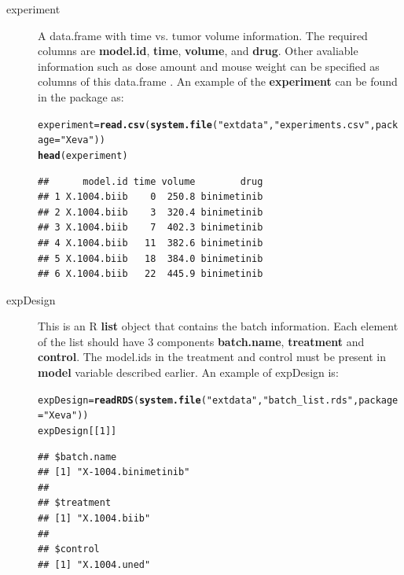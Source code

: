 \documentclass{article}\usepackage[]{graphicx}\usepackage[]{xcolor}
\makeatletter
\newcommand{\hlnum}[1]{\textcolor[rgb]{0.686,0.059,0.569}{#1}}%
\newcommand{\hlstr}[1]{\textcolor[rgb]{0.192,0.494,0.8}{#1}}%
\newcommand{\hlstd}[1]{\textcolor[rgb]{0.345,0.345,0.345}{#1}}%
\newcommand{\hlkwb}[1]{\textcolor[rgb]{0.69,0.353,0.396}{#1}}%
\newcommand{\hlkwc}[1]{\textcolor[rgb]{0.333,0.667,0.333}{#1}}%
\newcommand{\hlkwd}[1]{\textcolor[rgb]{0.737,0.353,0.396}{\textbf{#1}}}%
\newenvironment{kframe}{%
 \def\at@end@of@kframe{}%
 \ifinner\ifhmode%
  \def\at@end@of@kframe{\end{minipage}}%
  \begin{minipage}{\columnwidth}%
 \fi\fi%
 \def\FrameCommand##1{\hskip\@totalleftmargin \hskip-\fboxsep
 \colorbox{shadecolor}{##1}\hskip-\fboxsep
     \hskip-\linewidth \hskip-\@totalleftmargin \hskip\columnwidth}%
 \MakeFramed {\advance\hsize-\width
   \@totalleftmargin\z@ \linewidth\hsize
   \@setminipage}}%
 {\par\unskip\endMakeFramed%
 \at@end@of@kframe}
\newenvironment{knitrout}{}{} %
\makeatother
\begin{document}
\begin{description}
\item[experiment]
A data.frame with time vs. tumor volume information.
The required columns are \textbf{model.id}, \textbf{time}, \textbf{volume}, and \textbf{drug}.
Other avaliable information such as dose amount and mouse weight can be specified as columns of this data.frame .
An example of the \textbf{experiment} can be found in the package as:
\begin{knitrout}
\color{fgcolor}\begin{kframe}
\begin{alltt}
\hlstd{experiment}\hlkwb{=}\hlkwd{read.csv}\hlstd{(}\hlkwd{system.file}\hlstd{(}\hlstr{"extdata"}\hlstd{,}\hlstr{"experiments.csv"}\hlstd{,}\hlkwc{package}\hlstd{=}\hlstr{"Xeva"}\hlstd{))}
\hlkwd{head}\hlstd{(experiment)}
\end{alltt}
\begin{verbatim}
##      model.id time volume        drug
## 1 X.1004.biib    0  250.8 binimetinib
## 2 X.1004.biib    3  320.4 binimetinib
## 3 X.1004.biib    7  402.3 binimetinib
## 4 X.1004.biib   11  382.6 binimetinib
## 5 X.1004.biib   18  384.0 binimetinib
## 6 X.1004.biib   22  445.9 binimetinib
\end{verbatim}
\end{kframe}
\end{knitrout}

\item[expDesign]
This is an R \textbf{list} object that contains the batch information.
Each element of the list should have 3 components \textbf{batch.name},
\textbf{treatment} and \textbf{control}.
The model.ids in the treatment and control must be present in \textbf{model} variable described earlier.
An example of expDesign is:
\begin{knitrout}
\color{fgcolor}\begin{kframe}
\begin{alltt}
\hlstd{expDesign}\hlkwb{=}\hlkwd{readRDS}\hlstd{(}\hlkwd{system.file}\hlstd{(}\hlstr{"extdata"}\hlstd{,}\hlstr{"batch_list.rds"}\hlstd{,}\hlkwc{package}\hlstd{=}\hlstr{"Xeva"}\hlstd{))}
\hlstd{expDesign[[}\hlnum{1}\hlstd{]]}
\end{alltt}
\begin{verbatim}
## $batch.name
## [1] "X-1004.binimetinib"
## 
## $treatment
## [1] "X.1004.biib"
## 
## $control
## [1] "X.1004.uned"
\end{verbatim}
\end{kframe}
\end{knitrout}


\end{description}
\end{document}
